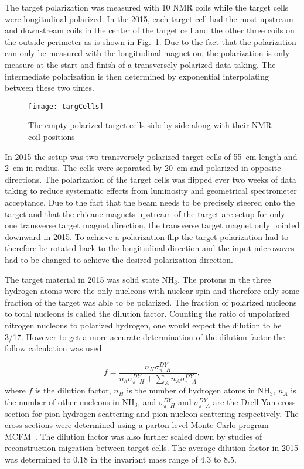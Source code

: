 The target polarization was measured with 10 NMR coils while the target cells
were longitudinal polarized.  In the 2015, each target cell had the most
upstream and downstream coils in the center of the target cell and the other
three coils on the outside perimeter as is shown in Fig.~\ref{fig::targCells}.
Due to the fact that the polarization can only be measured with the longitudinal
magnet on, the polarization is only measure at the start and finish of a
transversely polarized data taking.  The intermediate polarization is then
determined by exponential interpolating between these two times.

\begin{figure}[h!t]
  \centering
  \texttt{[image: targCells]}
  \caption{The empty polarized target cells side by side along with their NMR
    coil positions}
  \label{fig::targCells}
\end{figure}

In 2015 the setup was two transversely polarized target cells of 55~cm length
and 2~cm in radius.  The cells were separated by 20~cm and polarized in opposite
directions.  The polarization of the target cells was flipped ever two weeks of
data taking to reduce systematic effects from luminosity and geometrical
spectrometer acceptance.  Due to the fact that the beam needs to be precisely
steered onto the target and that the chicane magnets upstream of the target are
setup for only one transverse target magnet direction, the transverse target
magnet only pointed downward in 2015.  To achieve a polarization flip the target
polarization had to therefore be rotated back to the longitudinal direction and
the input microwaves had to be changed to achieve the desired polarization
direction. \par

The target material in 2015 was solid state NH$_3$.  The protons in the three
hydrogen atoms were the only nucleons with nuclear spin and therefore only some
fraction of the target was able to be polarized.  The fraction of polarized
nucleons to total nucleons is called the dilution factor.  Counting the ratio of
unpolarized nitrogen nucleons to polarized hydrogen, one would expect the
dilution to be 3/17.  However to get a more accurate determination of the
dilution factor the follow calculation was used

\begin{equation}
  f = \frac{n_H\sigma^{DY}_{\pi^-H}}
  {n_h\sigma^{DY}_{\pi^-H} + \sum_A n_A\sigma^{DY}_{\pi^-A}},
\end{equation}
where $f$ is the dilution factor, $n_H$ is the number of hydrogen atoms in
NH$_3$, $n_A$ is the number of other nucleons in NH$_3$, and
$\sigma^{DY}_{\pi^-H}$ and $\sigma^{DY}_{\pi^-A}$ are the Drell-Yan
cross-section for pion hydrogen scattering and pion nucleon scattering
respectively.  The cross-sections were determined using a parton-level
Monte-Carlo program MCFM~\cite{MCFM}.  The dilution factor was also further
scaled down by studies of reconstruction migration between target cells.  The
average dilution factor in 2015 was determined to 0.18 in the invariant mass
range of 4.3{\gvcs} to 8.5{\gvcs}.


